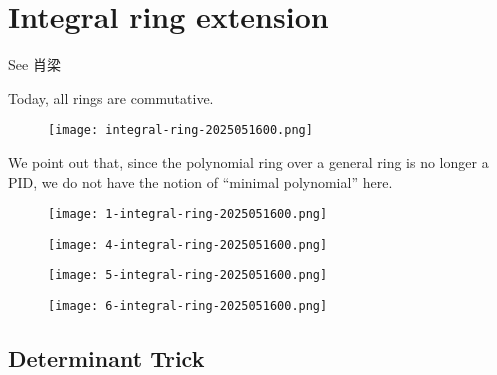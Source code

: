 \section{Integral ring extension}

See 肖梁

Today, all rings are commutative.

\begin{figure}[H]
\centering
\texttt{[image: integral-ring-2025051600.png]}
\label{}
\end{figure}

We point out that, since the polynomial ring over a general ring is no longer a PID, we do not have the notion of “minimal polynomial” here.

\begin{figure}[H]
\centering
\texttt{[image: 1-integral-ring-2025051600.png]}
\label{}
\end{figure}

\begin{figure}[H]
\centering
\texttt{[image: 4-integral-ring-2025051600.png]}
\label{}
\end{figure}

\begin{figure}[H]
\centering
\texttt{[image: 5-integral-ring-2025051600.png]}
\label{}
\end{figure}
\begin{figure}[H]
\centering
\texttt{[image: 6-integral-ring-2025051600.png]}
\label{}
\end{figure}

\subsection{Determinant Trick}


